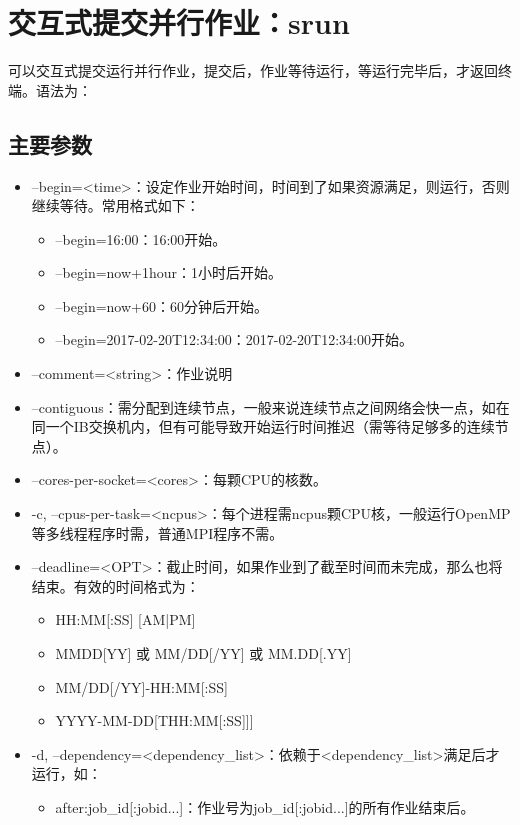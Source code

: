 \section{交互式提交并行作业：srun}
可以交互式提交运行并行作业，提交后，作业等待运行，等运行完毕后，才返回终端。语法为：
\subsection{主要参数}
\begin{itemize}
\item --begin=<time>：设定作业开始时间，时间到了如果资源满足，则运行，否则继续等待。常用格式如下：
\begin{itemize}
	\item --begin=16:00：16:00开始。
    \item --begin=now+1hour：1小时后开始。
    \item --begin=now+60：60分钟后开始。
    \item --begin=2017-02-20T12:34:00：2017-02-20T12:34:00开始。
\end{itemize}
\item --comment=<string>：作业说明
\item --contiguous：需分配到连续节点，一般来说连续节点之间网络会快一点，如在同一个IB交换机内，但有可能导致开始运行时间推迟（需等待足够多的连续节点）。
\item --cores-per-socket=<cores>：每颗CPU的核数。
\item -c, --cpus-per-task=<ncpus>：每个进程需ncpus颗CPU核，一般运行OpenMP等多线程程序时需，普通MPI程序不需。
\item --deadline=<OPT>：截止时间，如果作业到了截至时间而未完成，那么也将结束。有效的时间格式为：
\begin{itemize}
	\item HH:MM[:SS] [AM|PM]
    \item MMDD[YY] 或 MM/DD[/YY] 或 MM.DD[.YY]
    \item MM/DD[/YY]-HH:MM[:SS]
    \item YYYY-MM-DD[THH:MM[:SS]]]
\end{itemize}
\item -d, --dependency=<dependency\_list>：依赖于<dependency\_list>满足后才运行，如：
\begin{itemize}
	\item after:job\_id[:jobid...]：作业号为job\_id[:jobid...]的所有作业结束后。

\end{itemize}
\end{itemize}
